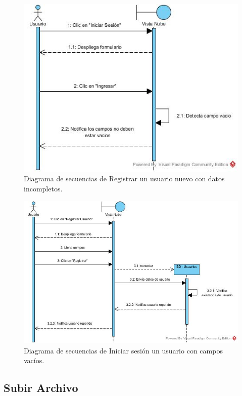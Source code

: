 \begin{figure}[htbp!]
\centering
\includegraphics[width=1\textwidth]{images/Iniciar_trayectoria_b}
\caption{Diagrama de secuencias de Registrar un usuario nuevo con datos incompletos.}
\end{figure}

\begin{figure}[htbp!]
\centering
\includegraphics[width=1\textwidth]{images/Registrar_trayectoria_c}
\caption{Diagrama de secuencias de Iniciar sesión un usuario con campos vacíos.}
\end{figure} 
\newpage

\subsection{Subir Archivo}


